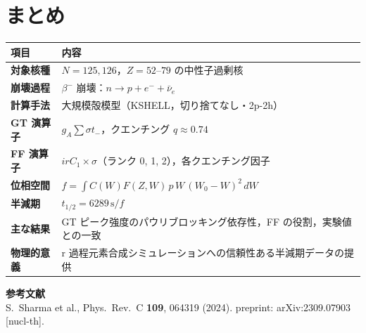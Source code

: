 \documentclass[12pt,a4paper]{ltjsarticle}
\begin{document}
\section{まとめ}

\begin{center}
\begin{tabular}{>{\bfseries}p{4cm}p{9.5cm}}
\toprule
項目 & 内容 \\
\midrule
対象核種 & $N=125,126$，$Z=52$--$79$ の中性子過剰核 \\
崩壊過程 & $\beta^-$ 崩壊：$n \to p + e^- + \bar\nu_e$ \\
計算手法 & 大規模殻模型（KSHELL，切り捨てなし・2p-2h） \\
GT 演算子 & $g_A \sum \sigma t_-$，クエンチング $q \approx 0.74$ \\
FF 演算子 & $irC_1 \times \sigma$（ランク 0, 1, 2），各クエンチング因子 \\
位相空間 & $f = \int C(W) F(Z,W)\, p\, W\, (W_0-W)^2\, dW$ \\
半減期 & $t_{1/2} = 6289\,\text{s} / f$ \\
主な結果 & GT ピーク強度のパウリブロッキング依存性，FF の役割，実験値との一致 \\
物理的意義 & r 過程元素合成シミュレーションへの信頼性ある半減期データの提供 \\
\bottomrule
\end{tabular}
\end{center}

\vspace{1.5em}
\noindent\textbf{参考文献}\\
S.~Sharma et al., Phys.\ Rev.\ C \textbf{109}, 064319 (2024).
preprint: arXiv:2309.07903 [nucl-th].
\end{document}
